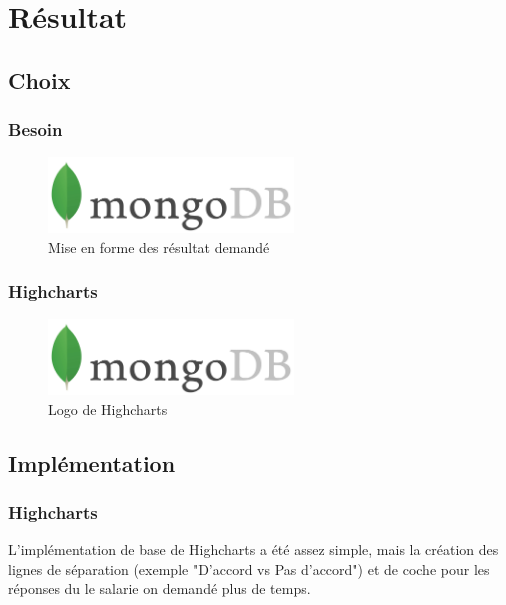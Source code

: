 \section{Résultat}

\subsection{Choix}

\subsubsection{Besoin}


\begin{figure}[H]
    \begin{center}
    \includegraphics[height=2.0cm]{img/mongodb}
    \end{center}
    \caption{Mise en forme des résultat demandé}
\end{figure}

\subsubsection{Highcharts}


\begin{figure}[H]
    \begin{center}
    \includegraphics[height=2.0cm]{img/mongodb}
    \end{center}
    \caption{Logo de Highcharts}
\end{figure}

\subsection{Implémentation}

\subsubsection{Highcharts}

L'implémentation de base de Highcharts a été assez simple, mais la création des lignes de séparation (exemple "D'accord vs Pas d'accord") et de coche pour les réponses du le salarie on demandé plus de temps. 

